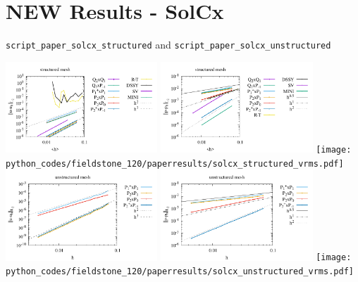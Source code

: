 \newpage
\section*{NEW Results - SolCx}

{\tt script\_paper\_solcx\_structured} and {\tt script\_paper\_solcx\_unstructured}

\begin{center}
\includegraphics[width=5.7cm]{python_codes/fieldstone_120/paperresults/solcx_structured_errorsV.pdf}
\includegraphics[width=5.7cm]{python_codes/fieldstone_120/paperresults/solcx_structured_errorsP.pdf}
\texttt{[image: python\_codes/fieldstone\_120/paperresults/solcx\_structured\_vrms.pdf]}\\
\includegraphics[width=5.7cm]{python_codes/fieldstone_120/paperresults/solcx_unstructured_errorsV.pdf}
\includegraphics[width=5.7cm]{python_codes/fieldstone_120/paperresults/solcx_unstructured_errorsP.pdf}
\texttt{[image: python\_codes/fieldstone\_120/paperresults/solcx\_unstructured\_vrms.pdf]}
\end{center}

